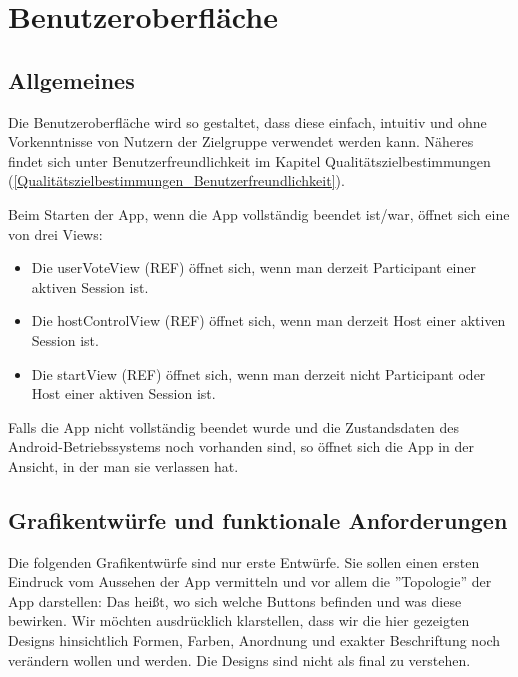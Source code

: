 \documentclass[oneside, ngerman]{sdqtechreport}
\begin{document}
\chapter{Benutzeroberfläche}
\label{chap:Benutzeroberfläche}

\section{Allgemeines}
\label{sec:Benutzeroberfläche:Allgemeines}
Die Benutzeroberfläche wird so gestaltet, dass diese einfach, intuitiv und ohne Vorkenntnisse von Nutzern der Zielgruppe verwendet werden kann. Näheres findet sich unter Benutzerfreundlichkeit im Kapitel Qualitätszielbestimmungen (\ref{Qualitätszielbestimmungen_Benutzerfreundlichkeit}).

Beim Starten der App, wenn die App vollständig beendet ist/war, öffnet sich eine von drei Views:
\begin{itemize}
    \item Die userVoteView (REF) öffnet sich, wenn man derzeit Participant einer aktiven Session ist.
    \item Die hostControlView (REF) öffnet sich, wenn man derzeit Host einer aktiven Session ist.
    \item Die startView (REF) öffnet sich, wenn man derzeit nicht Participant oder Host einer aktiven Session ist.
\end{itemize}
Falls die App nicht vollständig beendet wurde und die Zustandsdaten des Android-Betriebssystems noch vorhanden sind, so öffnet sich die App in der Ansicht, in der man sie verlassen hat.



\newpage

\section{Grafikentwürfe und funktionale Anforderungen}
\label{sec:Benutzeroberfläche:Grafiken}

Die folgenden Grafikentwürfe sind nur erste Entwürfe. Sie sollen einen ersten Eindruck vom Aussehen der App vermitteln und vor allem die ''Topologie'' der App darstellen: Das heißt, wo sich welche Buttons befinden und was diese bewirken. Wir möchten ausdrücklich klarstellen, dass wir die hier gezeigten Designs hinsichtlich Formen, Farben, Anordnung und exakter Beschriftung noch verändern wollen und werden. Die Designs sind nicht als final zu verstehen.
\end{document}
